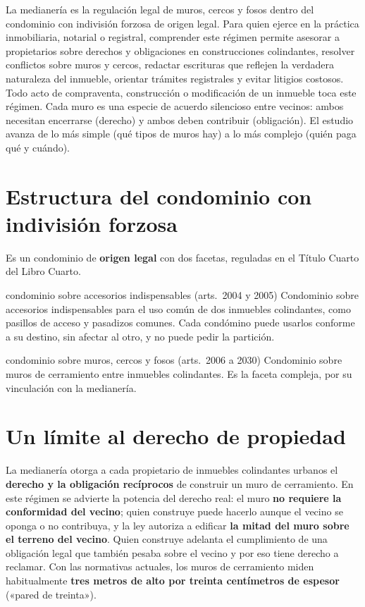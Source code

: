 \documentclass[12pt,oneside]{book}
\begin{document}
La medianería es la regulación legal de muros, cercos y fosos dentro del condominio con indivisión forzosa de origen legal. Para quien ejerce en la práctica inmobiliaria, notarial o registral, comprender este régimen permite asesorar a propietarios sobre derechos y obligaciones en construcciones colindantes, resolver conflictos sobre muros y cercos, redactar escrituras que reflejen la verdadera naturaleza del inmueble, orientar trámites registrales y evitar litigios costosos. Todo acto de compraventa, construcción o modificación de un inmueble toca este régimen. Cada muro es una especie de acuerdo silencioso entre vecinos: ambos necesitan encerrarse (derecho) y ambos deben contribuir (obligación). El estudio avanza de lo más simple (qué tipos de muros hay) a lo más complejo (quién paga qué y cuándo).

\section{Estructura del condominio con indivisión forzosa}

Es un condominio de \textbf{origen legal} con dos facetas, reguladas en el Título Cuarto del Libro Cuarto.

\begin{definicion}{condominio sobre accesorios indispensables (arts.~2004 y 2005)}
Condominio sobre accesorios indispensables para el uso común de dos inmuebles colindantes, como pasillos de acceso y pasadizos comunes. Cada condómino puede usarlos conforme a su destino, sin afectar al otro, y no puede pedir la partición.
\end{definicion}

\begin{definicion}{condominio sobre muros, cercos y fosos (arts.~2006 a 2030)}
Condominio sobre muros de cerramiento entre inmuebles colindantes. Es la faceta compleja, por su vinculación con la medianería.
\end{definicion}

\section{Un límite al derecho de propiedad}

La medianería otorga a cada propietario de inmuebles colindantes urbanos el \textbf{derecho y la obligación recíprocos} de construir un muro de cerramiento. En este régimen se advierte la potencia del derecho real: el muro \textbf{no requiere la conformidad del vecino}; quien construye puede hacerlo aunque el vecino se oponga o no contribuya, y la ley autoriza a edificar \textbf{la mitad del muro sobre el terreno del vecino}. Quien construye adelanta el cumplimiento de una obligación legal que también pesaba sobre el vecino y por eso tiene derecho a reclamar. Con las normativas actuales, los muros de cerramiento miden habitualmente \textbf{tres metros de alto por treinta centímetros de espesor} («pared de treinta»).
\end{document}
